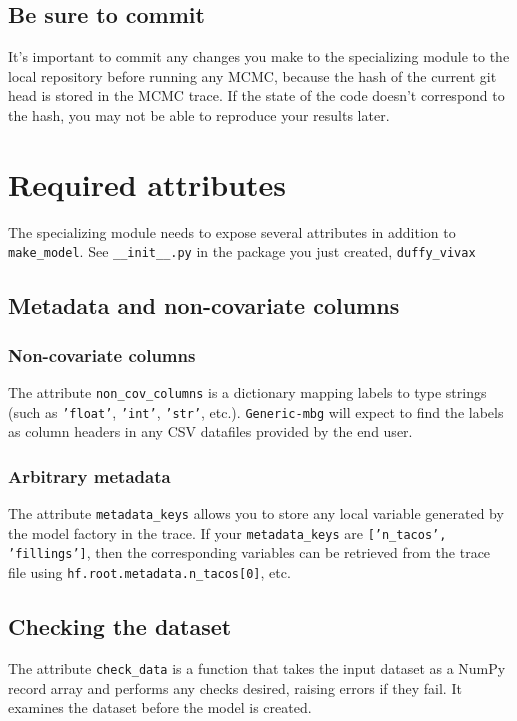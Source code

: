 \subsection{Be sure to commit}
\label{sub:git-commit} 
It's important to commit any changes you make to the specializing module to the local repository before running any MCMC, because the hash of the current git head is stored in the MCMC trace. If the state of the code doesn't correspond to the hash, you may not be able to reproduce your results later.

\section{Required attributes}

The specializing module needs to expose several attributes in addition to \texttt{make\_model}. See \texttt{\_\_init\_\_.py} in the package you just created, \texttt{duffy\_vivax}

\subsection{Metadata and non-covariate columns}
\subsubsection{Non-covariate columns} 
The attribute \texttt{non\_cov\_columns} is a dictionary mapping labels to type strings (such as \texttt{'float'}, \texttt{'int'}, \texttt{'str'}, etc.). \texttt{Generic-mbg} will expect to find the labels as column headers in any CSV datafiles provided by the end user. 
\subsubsection{Arbitrary metadata} 
The attribute \texttt{metadata\_keys} allows you to store any local variable generated by the model factory in the trace. If your \texttt{metadata\_keys} are \texttt{['n\_tacos', 'fillings']}, then the corresponding variables can be retrieved from the trace file using \texttt{hf.root.metadata.n\_tacos[0]}, etc.

\subsection{Checking the dataset}
The attribute \texttt{check\_data} is a function that takes the input dataset as a NumPy record array and performs any checks desired, raising errors if they fail. It examines the dataset before the model is created.

